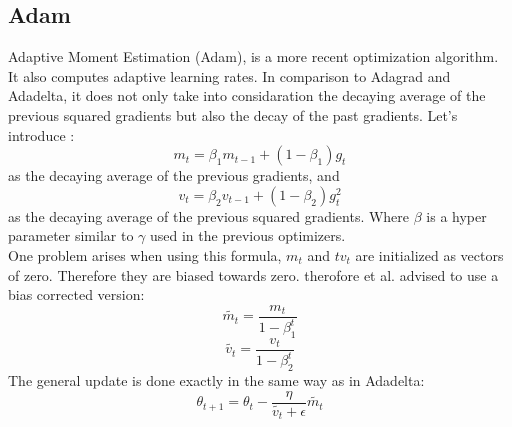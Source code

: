 \subsection{Adam}
Adaptive Moment Estimation (Adam), is a more recent optimization algorithm. It also computes adaptive learning rates. In comparison to Adagrad and Adadelta, it does not only take into considaration the decaying average of the previous squared gradients but also the decay of the past gradients. 
Let's introduce : 
\begin{equation}
m_t = \beta_1 m_{t-1} + (1- \beta_1) g_t 
\end{equation}
as the decaying average of the previous gradients, and 
\begin{equation}
v_t = \beta_2 v_{t-1} + (1- \beta_2) g^2_t 
\end{equation}
 as the decaying average of the previous squared gradients. Where $\beta$ is a hyper parameter similar to $\gamma$ used in the previous optimizers. \\
One problem arises when using this formula, $m_t$  and $tv_t$ are initialized as vectors of zero. Therefore they are biased towards zero. therofore et al. advised to use a bias corrected version:\\
\begin{equation}
\tilde{m_t} = \frac{m_t}{1-\beta^t_1}
\end{equation}
\begin{equation}
\tilde{v_t} = \frac{v_t}{1-\beta^t_2}
\end{equation}
The general update is done exactly in the same way as in Adadelta:
\begin{equation}
\theta_{t+1} = \theta_t - \frac{\eta}{\tilde{v_t}+ \epsilon} \tilde{m_t}
\end{equation}

